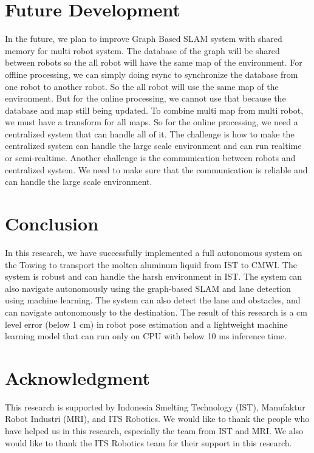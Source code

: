 \documentclass[conference]{IEEEtran}
\begin{document}

\section{Future Development}
In the future, we plan to improve Graph Based SLAM system with shared memory for multi robot system. The database of the graph will be shared between robots so the all robot will have the same map of the environment. For offline processing, we can simply doing rsync to synchronize the database from one robot to another robot. So the all robot will use the same map of the environment. But for the online processing, we cannot use that because the database and map still being updated. To combine multi map from multi robot, we must have a transform for all maps. So for the online processing, we need a centralized system that can handle all of it. The challenge is how to make the centralized system can handle the large scale environment and can run realtime or semi-realtime. Another challenge is the communication between robots and centralized system. We need to make sure that the communication is reliable and can handle the large scale environment.

\section{Conclusion} 
In this research, we have successfully implemented a full autonomous system on the Towing to transport the molten aluminum liquid from IST to CMWI. The system is robust and can handle the harsh environment in IST. The system can also navigate autonomously using the graph-based SLAM and lane detection using machine learning. The system can also detect the lane and obstacles, and can navigate autonomously to the destination. The result of this research is a cm level error (below 1 cm) in robot pose estimation and a lightweight machine learning model that can run only on CPU with below 10 ms inference time. 


\section{Acknowledgment}
This research is supported by Indonesia Smelting Technology (IST), Manufaktur Robot Industri (MRI), and ITS Robotics. We would like to thank the people who have helped us in this research, especially the team from IST and MRI. We also would like to thank the ITS Robotics team for their support in this research. 





\end{document}
